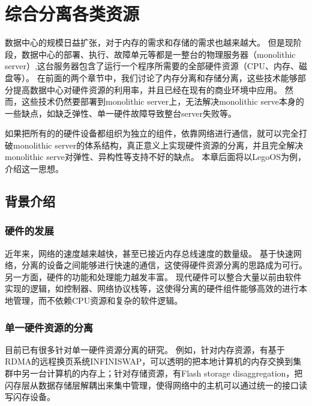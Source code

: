 
\chapter{综合分离各类资源} %

\label{Chapter4} %

数据中心的规模日益扩张，对于内存的需求和存储的需求也越来越大。
但是现阶段，数据中心的部署、执行、故障单元等都是一整台的物理服务器（monolithic server）,这台服务器包含了运行一个程序所需要的全部硬件资源（CPU、内存、磁盘等）。
在前面的两个章节中，我们讨论了内存分离和存储分离，这些技术能够部分提高数据中心对硬件资源的利用率，并且已经在现有的商业环境中应用。
然而，这些技术仍然要部署到monolithic server上，无法解决monolithic serve本身的一些缺点，如缺乏弹性、单一硬件故障导致整台server失败等。

如果把所有的的硬件设备都组织为独立的组件，依靠网络进行通信，就可以完全打破monolithic server的体系结构，真正意义上实现硬件资源的分离，并且完全解决monolithic serve对弹性、异构性等支持不好的缺点。
本章后面将以LegoOS为例，介绍这一思想。


\section{背景介绍}

\subsection{硬件的发展}

近年来，网络的速度越来越快，甚至已接近内存总线速度的数量级。
基于快速网络，分离的设备之间能够进行快速的通信，这使得硬件资源分离的思路成为可行。
另一方面，硬件的功能和处理能力越发丰富。
现代硬件可以整合大量以前由软件实现的逻辑，如控制器、网络协议栈等，这使得分离的硬件组件能够高效的进行本地管理，而不依赖CPU资源和复杂的软件逻辑。

\subsection{单一硬件资源的分离}

目前已有很多针对单一硬件资源分离的研究。
例如，针对内存资源，有基于RDMA的远程换页系统INFINISWAP\cite{gu2017efficient}，可以透明的把本地计算机的内存交换到集群中另一台计算机的内存上；针对存储资源，有Flash storage disaggregation\cite{klimovic2016flash}，把闪存层从数据存储层解耦出来集中管理，使得网络中的主机可以通过统一的接口读写闪存设备。

